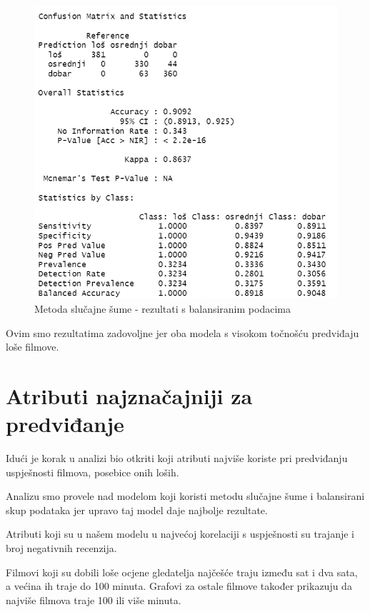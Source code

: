 \begin{figure}[H]
	\centering
	\includegraphics[width=15cm]{../figures/expl/006.png}
	\caption{Metoda slučajne šume - rezultati s balansiranim podacima}
	\label{fig:ml6}
\end{figure}

Ovim smo rezultatima zadovoljne jer oba modela s visokom točnošću predviđaju loše filmove.

\section{Atributi najznačajniji za predviđanje}

Idući je korak u analizi bio otkriti koji atributi najviše koriste pri predviđanju uspješnosti filmova, posebice onih loših.

Analizu smo provele nad modelom koji koristi metodu slučajne šume i balansirani skup podataka jer upravo taj model daje najbolje rezultate.

Atributi koji su u našem modelu u najvećoj korelaciji s uspješnosti su trajanje i broj negativnih recenzija. 

Filmovi koji su dobili loše ocjene gledatelja najčešće traju između sat i dva sata, a većina ih traje do 100 minuta. Grafovi za ostale filmove također prikazuju da najviše filmova traje 100 ili više minuta.

